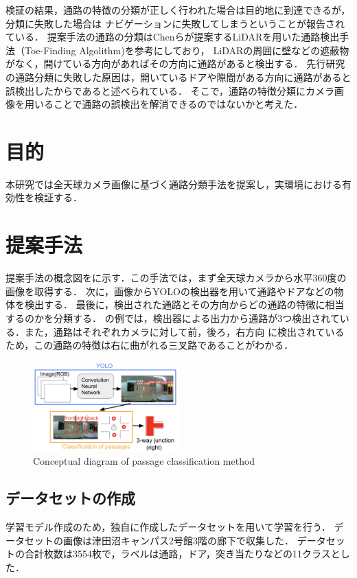 \documentclass[10pt]{jarticle}
\begin{document}
    検証の結果，通路の特徴の分類が正しく行われた場合は目的地に到達できるが，分類に失敗した場合は
    ナビゲーションに失敗してしまうということが報告されている．
    提案手法の通路の分類はChenらが提案するLiDARを用いた通路検出手法（Toe-Finding Algolithm)\cite{toe_finding_algolithm}を参考にしており，
    LiDARの周囲に壁などの遮蔽物がなく，開けている方向があればその方向に通路があると検出する．
    先行研究の通路分類に失敗した原因は，開いているドアや隙間がある方向に通路があると誤検出したからであると述べられている．
    そこで，通路の特徴分類にカメラ画像を用いることで通路の誤検出を解消できるのではないかと考えた．

    \section{目\hspace{2zw}的}
    本研究では全天球カメラ画像に基づく通路分類手法を提案し，実環境における有効性を検証する．
    
    \section{提案手法}%
    提案手法の概念図をに示す．この手法では，まず全天球カメラから水平360度の画像を取得する．
    次に，画像からYOLOの検出器を用いて通路やドアなどの物体を検出する．
    最後に，検出された通路とその方向からどの通路の特徴に相当するのかを分類する．
    の例では，検出器による出力から通路が3つ検出されている．また，通路はそれぞれカメラに対して前，後ろ，右方向
    に検出されているため，この通路の特徴は右に曲がれる三叉路であることがわかる．
    
    \begin{figure}
        \includegraphics[width=0.5\textwidth]{./fig/fontbig2_proposed_method.png}
        \caption{Conceptual diagram of passage classification method}
        \label{fig:proposed_method}
    \end{figure}
    

    \subsection{データセットの作成}
     学習モデル作成のため，独自に作成したデータセットを用いて学習を行う．
     データセットの画像は津田沼キャンパス2号館3階の廊下で収集した．
     データセットの合計枚数は3554枚で，ラベルは通路，ドア，突き当たりなどの11クラスとした．
\end{document}
